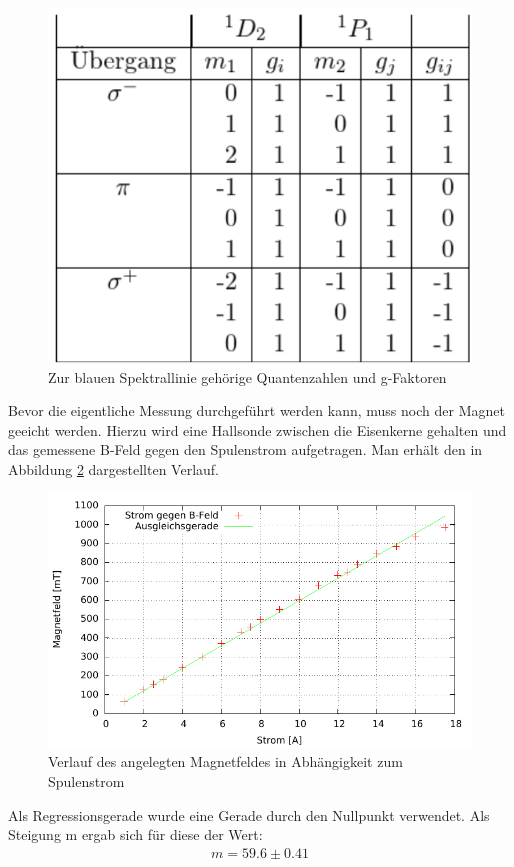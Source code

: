 \begin{figure}[htbp]
\includegraphics[scale=0.5]{../pics/theo1.pdf}
\caption{Zur blauen Spektrallinie gehörige Quantenzahlen und g-Faktoren}
\label{tab_über_b}
\end{figure}
\newpage
Bevor die eigentliche Messung durchgeführt werden kann, muss noch der Magnet geeicht werden. Hierzu wird eine Hallsonde zwischen die Eisenkerne gehalten und das gemessene B-Feld gegen den Spulenstrom aufgetragen. Man erhält den in Abbildung \ref{pic_mag} dargestellten Verlauf.
\begin{figure}
\includegraphics[scale=1]{../gnu/Magnet.pdf}
\caption{Verlauf des angelegten Magnetfeldes in Abhängigkeit zum Spulenstrom}
\label{pic_mag}
\end{figure}
Als Regressionsgerade wurde eine Gerade durch den Nullpunkt verwendet. Als Steigung m ergab sich für diese der Wert:
\begin{align*}
m=59.6  \pm 0.41
\end{align*}

